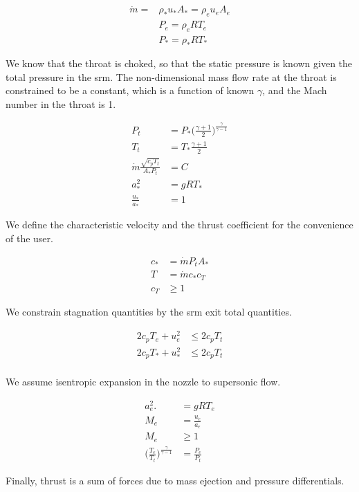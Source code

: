 \begin{align}
    \dot{m} = &\rho_* u_* A_* = \rho_e u_e A_e \\
    &P_e = \rho_e R T_e \\
    &P_* = \rho_* R T_*
\end{align}

We know that the throat is choked, so that the static pressure
is known given the total pressure in the \gls{srm}. The non-dimensional
mass flow rate at the throat is constrained to be a constant,
which is a function of known $\gamma$, and the Mach number in the throat is 1.

\begin{align}
    P_t &= P_* \Big(\frac{\gamma + 1}{2}\Big)^{\frac{\gamma}{\gamma-1}} \\
    T_t &= T_* \frac{\gamma + 1}{2} \\
    \dot{m} \frac{\sqrt{c_p T_t}}{A_* P_t} &= C \\
    a_*^2 &= gRT_* \\
    \frac{u_*}{a_*} &= 1
\end{align}

We define the characteristic velocity and the thrust coefficient for the
convenience of the user.

\begin{align}
    c_* &= \dot{m} P_t A_* \\
    T &= \dot{m} c_* c_T \\
    c_T &\geq 1
\end{align}

We constrain stagnation quantities by the \gls{srm} exit total quantities.

\begin{align}
    2 c_p T_e + u_e^2 &\leq 2 c_p T_t \\
    2 c_p T_* + u_*^2 &\leq 2 c_p T_t \\
\end{align}

We assume isentropic expansion in the nozzle to supersonic flow.

\begin{align}
    a_e^2. &= gRT_e \\
    M_e &= \frac{u_e}{a_e} \\
    M_e &\geq 1 \\
    \Big(\frac{T_e}{T_t}\Big)^{\frac{\gamma}{\gamma-1}} &= \frac{P_e}{P_t}
\end{align}

Finally, thrust is a sum of forces due to mass ejection and pressure differentials.

